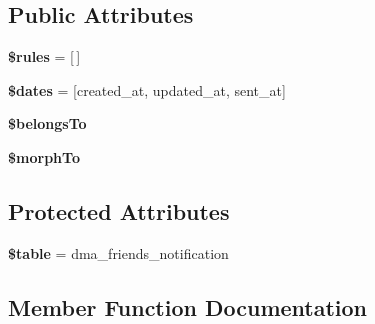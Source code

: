 \subsection*{Public Attributes}
\begin{DoxyCompactItemize}
\item 
\hypertarget{classDMA_1_1Friends_1_1Models_1_1Notification_a766ad083edbdd33b589c50997154eed2}{}{\bfseries \$rules} = \mbox{[}$\,$\mbox{]}\label{classDMA_1_1Friends_1_1Models_1_1Notification_a766ad083edbdd33b589c50997154eed2}

\item 
\hypertarget{classDMA_1_1Friends_1_1Models_1_1Notification_a5fb26a98fb9520c1444568e1c7e3515d}{}{\bfseries \$dates} = \mbox{[}\textquotesingle{}created\+\_\+at\textquotesingle{}, \textquotesingle{}updated\+\_\+at\textquotesingle{}, \textquotesingle{}sent\+\_\+at\textquotesingle{}\mbox{]}\label{classDMA_1_1Friends_1_1Models_1_1Notification_a5fb26a98fb9520c1444568e1c7e3515d}

\item 
{\bfseries \$belongs\+To}
\item 
{\bfseries \$morph\+To}
\end{DoxyCompactItemize}
\subsection*{Protected Attributes}
\begin{DoxyCompactItemize}
\item 
\hypertarget{classDMA_1_1Friends_1_1Models_1_1Notification_a4ff4d970351d372ad03efddcce990756}{}{\bfseries \$table} = \textquotesingle{}dma\+\_\+friends\+\_\+notification\textquotesingle{}\label{classDMA_1_1Friends_1_1Models_1_1Notification_a4ff4d970351d372ad03efddcce990756}

\end{DoxyCompactItemize}


\subsection{Member Function Documentation}
\hypertarget{classDMA_1_1Friends_1_1Models_1_1Notification_a8618793fa0a9030d6cbfae08a3b74803}{}
